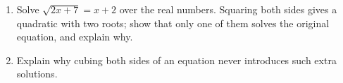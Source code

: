 \begin{enumerate}
\item[(a)] Solve $\sqrt{2x+7}=x+2$ over the real numbers. Squaring both sides gives a quadratic with two roots; show that only one of them solves the original equation, and explain why.
\item[(b)] Explain why cubing both sides of an equation never introduces such extra solutions.
\end{enumerate}
